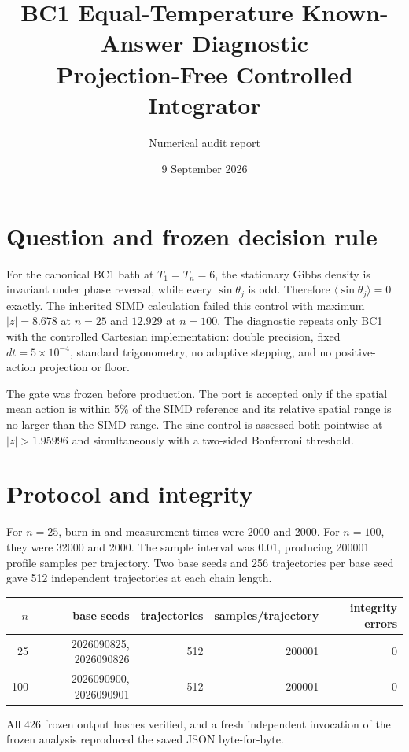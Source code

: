 \documentclass[10pt]{article}
\title{BC1 Equal-Temperature Known-Answer Diagnostic\\Projection-Free Controlled Integrator}
\author{Numerical audit report}
\date{9 September 2026}
\begin{document}
\maketitle

\section{Question and frozen decision rule}
For the canonical BC1 bath at $T_1=T_n=6$, the stationary Gibbs density is
invariant under phase reversal, while every $\sin\theta_j$ is odd. Therefore
$\langle\sin\theta_j\rangle=0$ exactly. The inherited SIMD calculation failed
this control with maximum $|z|=8.678$ at $n=25$ and $12.929$ at $n=100$.
The diagnostic repeats only BC1 with the controlled Cartesian implementation:
double precision, fixed $dt=5\times10^{-4}$, standard trigonometry, no
adaptive stepping, and no positive-action projection or floor.

The gate was frozen before production. The port is accepted only if the
spatial mean action is within 5\% of the SIMD reference and its relative
spatial range is no larger than the SIMD range. The sine control is assessed
both pointwise at $|z|>1.95996$ and simultaneously with a two-sided
Bonferroni threshold.

\section{Protocol and integrity}
For $n=25$, burn-in and measurement times were 2000 and 2000. For $n=100$,
they were 32000 and 2000. The sample interval was 0.01, producing 200001
profile samples per trajectory. Two base seeds and 256 trajectories per base
seed gave 512 independent trajectories at each chain length.

\begin{center}
\begin{tabular}{rrrrr}
\toprule
$n$ & base seeds & trajectories & samples/trajectory & integrity errors\\
\midrule
25 & 2026090825, 2026090826 & 512 & 200001 & 0\\
100 & 2026090900, 2026090901 & 512 & 200001 & 0\\
\bottomrule
\end{tabular}
\end{center}

All 426 frozen output hashes verified, and a fresh independent invocation of
the frozen analysis reproduced the saved JSON byte-for-byte.
\end{document}

